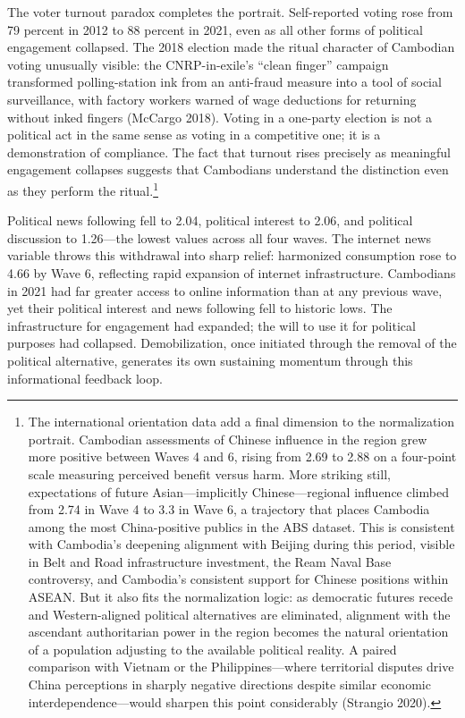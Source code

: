 \documentclass[Review,times,sageh,doublespace]{sagej}
\begin{document}
The voter turnout paradox completes the portrait. Self-reported voting
rose from 79 percent in 2012 to 88 percent in 2021, even as all other
forms of political engagement collapsed. The 2018 election made the
ritual character of Cambodian voting unusually visible: the
CNRP-in-exile's ``clean finger'' campaign transformed polling-station
ink from an anti-fraud measure into a tool of social surveillance, with
factory workers warned of wage deductions for returning without inked
fingers (McCargo 2018). Voting in a one-party election is not a
political act in the same sense as voting in a competitive one; it is a
demonstration of compliance. The fact that turnout rises precisely as
meaningful engagement collapses suggests that Cambodians understand the
distinction even as they perform the ritual.\footnote{The international
  orientation data add a final dimension to the normalization portrait.
  Cambodian assessments of Chinese influence in the region grew more
  positive between Waves 4 and 6, rising from 2.69 to 2.88 on a
  four-point scale measuring perceived benefit versus harm. More
  striking still, expectations of future Asian---implicitly
  Chinese---regional influence climbed from 2.74 in Wave 4 to 3.3 in
  Wave 6, a trajectory that places Cambodia among the most
  China-positive publics in the ABS dataset. This is consistent with
  Cambodia's deepening alignment with Beijing during this period,
  visible in Belt and Road infrastructure investment, the Ream Naval
  Base controversy, and Cambodia's consistent support for Chinese
  positions within ASEAN. But it also fits the normalization logic: as
  democratic futures recede and Western-aligned political alternatives
  are eliminated, alignment with the ascendant authoritarian power in
  the region becomes the natural orientation of a population adjusting
  to the available political reality. A paired comparison with Vietnam
  or the Philippines---where territorial disputes drive China
  perceptions in sharply negative directions despite similar economic
  interdependence---would sharpen this point considerably (Strangio
  2020).}

Political news following fell to 2.04, political interest to 2.06, and
political discussion to 1.26---the lowest values across all four waves.
The internet news variable throws this withdrawal into sharp relief:
harmonized consumption rose to 4.66 by Wave 6, reflecting rapid
expansion of internet infrastructure. Cambodians in 2021 had far greater
access to online information than at any previous wave, yet their
political interest and news following fell to historic lows. The
infrastructure for engagement had expanded; the will to use it for
political purposes had collapsed. Demobilization, once initiated through
the removal of the political alternative, generates its own sustaining
momentum through this informational feedback loop.
\end{document}
